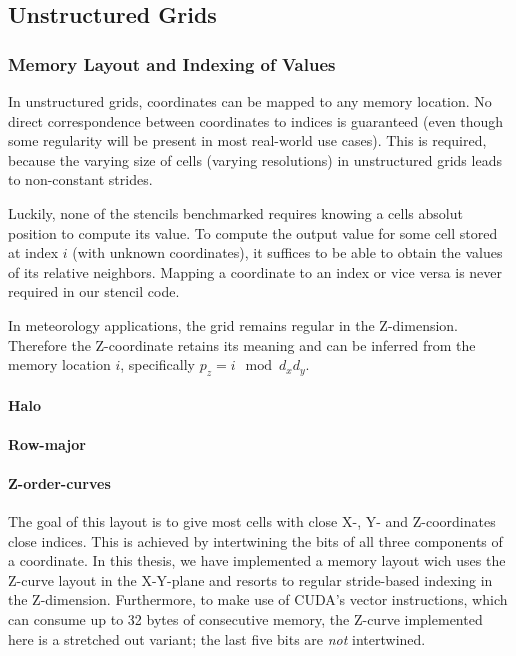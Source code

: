 \subsection{Unstructured Grids}

\subsubsection{Memory Layout and Indexing of Values}

In unstructured grids, coordinates can be mapped to any memory location. No direct correspondence between coordinates to indices is guaranteed (even though some regularity will be present in most real-world use cases). This is required, because the varying size of cells (varying resolutions) in unstructured grids leads to non-constant strides.

Luckily, none of the stencils benchmarked requires knowing a cells absolut position to compute its value. To compute the output value for some cell stored at index $i$ (with unknown coordinates), it suffices to be able to obtain the values of its relative neighbors. Mapping a coordinate to an index or vice versa is never required in our stencil code.

In meteorology applications, the grid remains regular in the Z-dimension. Therefore the Z-coordinate retains its meaning and can be inferred from the memory location $i$, specifically $p_z = i \mod d_xd_y$.

\paragraph{Halo}


\paragraph{Row-major}


\paragraph{Z-order-curves}

The goal of this layout is to give most cells with close X-, Y- and Z-coordinates close indices. This is achieved by intertwining the bits of all three components of a coordinate. In this thesis, we have implemented a memory layout wich uses the Z-curve layout in the X-Y-plane and resorts to regular stride-based indexing in the Z-dimension. Furthermore, to make use of CUDA's vector instructions, which can consume up to 32 bytes of consecutive memory, the Z-curve implemented here is a stretched out variant; the last five bits are \emph{not} intertwined.


